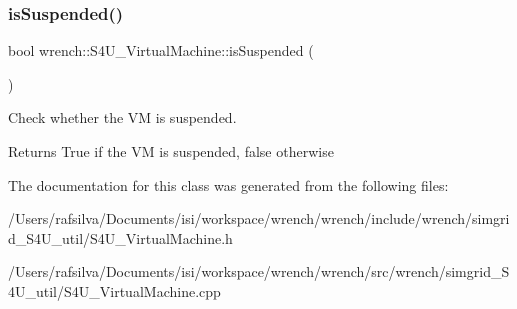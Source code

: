\subsubsection{\texorpdfstring{is\+Suspended()}{isSuspended()}}
{\footnotesize\ttfamily bool wrench\+::\+S4\+U\+\_\+\+Virtual\+Machine\+::is\+Suspended (\begin{DoxyParamCaption}{ }\end{DoxyParamCaption})}



Check whether the VM is suspended. 

\begin{DoxyReturn}{Returns}
True if the VM is suspended, false otherwise 
\end{DoxyReturn}


The documentation for this class was generated from the following files\+:\begin{DoxyCompactItemize}
\item 
/\+Users/rafsilva/\+Documents/isi/workspace/wrench/wrench/include/wrench/simgrid\+\_\+\+S4\+U\+\_\+util/S4\+U\+\_\+\+Virtual\+Machine.\+h\item 
/\+Users/rafsilva/\+Documents/isi/workspace/wrench/wrench/src/wrench/simgrid\+\_\+\+S4\+U\+\_\+util/S4\+U\+\_\+\+Virtual\+Machine.\+cpp\end{DoxyCompactItemize}
